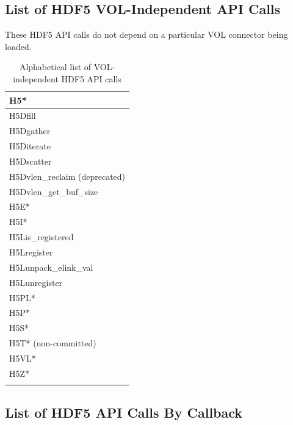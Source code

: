 \subsection{List of HDF5 VOL-Independent API Calls}

These HDF5 API calls do not depend on a particular VOL connector being loaded.

\begin{longtable}{ |>{\raggedright\arraybackslash}p{\linewidth}| }
    \hline
    H5* \\
    \hline
    H5Dfill \\
    H5Dgather \\
    H5Diterate \\
    H5Dscatter \\
    H5Dvlen\_reclaim (deprecated) \\
    H5Dvlen\_get\_buf\_size \\
    \hline
    H5E* \\
    H5I* \\
    \hline
    H5Lis\_registered \\
    H5Lregister \\
    H5Lunpack\_elink\_val \\
    H5Lunregister \\
    \hline
    H5PL* \\
    H5P* \\
    H5S* \\
    H5T* (non-committed) \\
    H5VL* \\
    H5Z* \\
    \hline
\caption{Alphabetical list of VOL-independent HDF5 API calls}
\end{longtable}

\subsection{List of HDF5 API Calls By Callback}

